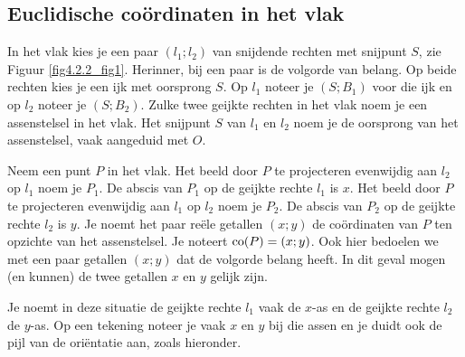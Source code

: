 \subsection{Euclidische co\"ordinaten in het vlak}

In het vlak kies je een paar $(l_1;l_2)$ van snijdende rechten met snijpunt $S$, zie Figuur \ref{fig4.2.2_fig1}.
Herinner, bij een paar is de volgorde van belang.
Op beide rechten kies je een ijk met oorsprong $S$.
Op $l_1$ noteer je $(S;B_1)$ voor die ijk en op $l_2$ noteer je $(S;B_2)$.
Zulke twee geijkte rechten in het vlak noem je een assenstelsel in het vlak.
Het snijpunt $S$ van $l_1$ en $l_2$ noem je de oorsprong van het assenstelsel, vaak aangeduid met $O$.

\begin{center}

\end{center}



Neem een punt $P$ in het vlak.
Het beeld door $P$ te projecteren evenwijdig aan $l_2$ op $l_1$ noem je $P_1$.
De abscis van $P_1$  op de geijkte rechte $l_1$ is $x$.
Het beeld door $P$ te projecteren evenwijdig aan $l_1$ op $l_2$ noem je $P_2$.
De abscis van $P_2$ op de geijkte rechte $l_2$ is $y$.
Je noemt het paar re\"ele getallen $(x;y)$ de co\"ordinaten van $P$ ten opzichte van het assenstelsel.
Je noteert $\operatorname{co} (P)=(x;y)$.
Ook hier bedoelen we met een paar getallen $(x;y)$ dat de volgorde belang heeft.
In dit geval mogen (en kunnen) de twee getallen $x$ en $y$ gelijk zijn.

Je noemt in deze situatie de geijkte rechte $l_1$ vaak de $x$-as en de geijkte rechte $l_2$ de $y$-as.
Op een tekening noteer je vaak $x$ en $y$ bij die assen en je duidt ook de pijl van de ori\"entatie aan, zoals hieronder.

\begin{center}

\end{center}


